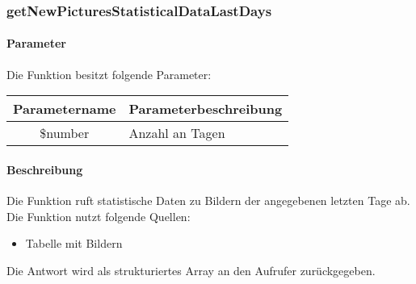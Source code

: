 \subsubsection{getNewPicturesStatisticalDataLastDays}
\paragraph{Parameter} Die Funktion besitzt folgende Parameter:
\begin{table}[H]
	\begin{tabular}{|c|p{11cm}|}
		\hline
		\textbf{Parametername} & \textbf{Parameterbeschreibung} \\ \hline
		\$number & Anzahl an Tagen \\ \hline
	\end{tabular}
\end{table}
\paragraph{Beschreibung} Die Funktion ruft statistische Daten zu Bildern der angegebenen letzten Tage ab. Die Funktion nutzt folgende Quellen:
\begin{itemize}
	\item Tabelle mit Bildern
\end{itemize}
Die Antwort wird als strukturiertes Array an den Aufrufer zurückgegeben.